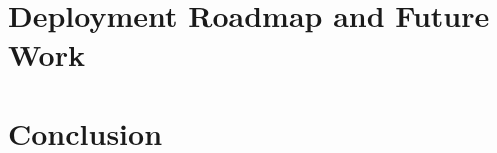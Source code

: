 \documentclass[lettersize,journal, twocolumn]{IEEEtran}
\begin{document}
\section{Deployment Roadmap and Future Work}
\label{Sec:Known_Gaps_and_Next_Steps_Toward_Deployment}


\section{Conclusion}
\label{Sec:Conclusion}




\end{document}
